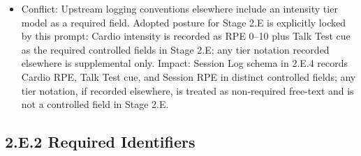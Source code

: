 \documentclass[10pt]{article}
\begin{document}
\begin{itemize}
\item Conflict: Upstream logging conventions elsewhere include an intensity tier model as a required field. Adopted posture for Stage 2.E is explicitly locked by this prompt: Cardio intensity is recorded as RPE 0–10 plus Talk Test cue as the required controlled fields in Stage 2.E; any tier notation recorded elsewhere is supplemental only. Impact: Session Log schema in 2.E.4 records Cardio RPE, Talk Test cue, and Session RPE in distinct controlled fields; any tier notation, if recorded elsewhere, is treated as non-required free-text and is not a controlled field in Stage 2.E.
\end{itemize}

\newpage

\begin{landscape}

\subsection*{2.E.2 Required Identifiers}
{}

\begingroup
\scriptsize
\setlength{\tabcolsep}{2pt}
\renewcommand{\arraystretch}{1.12}


\end{landscape}
\end{document}

